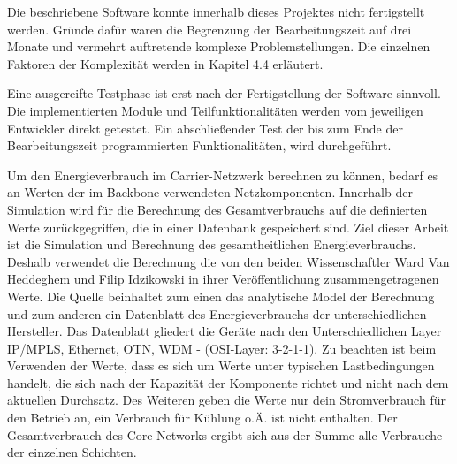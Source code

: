Die beschriebene Software konnte innerhalb dieses Projektes nicht fertigstellt werden. Gründe dafür waren die Begrenzung der Bearbeitungszeit auf drei Monate und vermehrt auftretende komplexe Problemstellungen. Die einzelnen Faktoren der Komplexität werden in Kapitel 4.4 erläutert.


Eine ausgereifte Testphase ist erst nach der Fertigstellung der Software sinnvoll. Die implementierten Module und Teilfunktionalitäten werden vom jeweiligen Entwickler direkt getestet. Ein abschließender Test der bis zum Ende der Bearbeitungszeit programmierten Funktionalitäten, wird durchgeführt.


Um den Energieverbrauch im Carrier-Netzwerk berechnen zu können, bedarf es an Werten der im Backbone verwendeten Netzkomponenten. Innerhalb der Simulation wird für die Berechnung des Gesamtverbrauchs auf die definierten Werte zurückgegriffen, die in einer Datenbank gespeichert sind. Ziel dieser Arbeit ist die Simulation und Berechnung des gesamtheitlichen Energieverbrauchs. Deshalb verwendet die Berechnung die von den beiden Wissenschaftler Ward Van Heddeghem und Filip Idzikowski in ihrer Veröffentlichung \cite{vanhedde} zusammengetragenen Werte. Die Quelle beinhaltet zum einen das analytische Model der Berechnung und zum anderen ein Datenblatt \cite{vanhsheet} des Energieverbrauchs der unterschiedlichen Hersteller. Das Datenblatt gliedert die Geräte nach den Unterschiedlichen Layer IP/MPLS, Ethernet, OTN, WDM - (OSI-Layer: 3-2-1-1). Zu beachten ist beim Verwenden der Werte, dass es sich um Werte unter typischen Lastbedingungen handelt, die sich nach der Kapazität der Komponente richtet und nicht nach dem aktuellen Durchsatz. Des Weiteren geben die Werte nur dein Stromverbrauch für den Betrieb an, ein Verbrauch für Kühlung o.Ä. ist nicht enthalten.
Der Gesamtverbrauch des Core-Networks ergibt sich aus der Summe alle Verbrauche der einzelnen Schichten.



